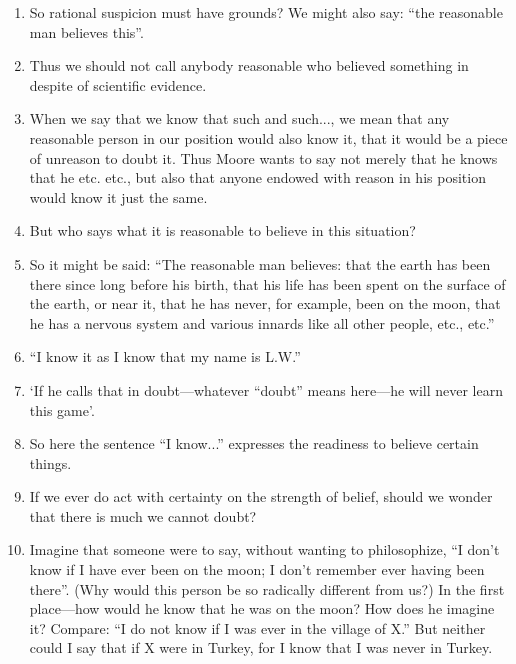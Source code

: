\documentclass{book}
\begin{document}
\begin{enumerate}
\item
So rational suspicion must have grounds?  We might also say: ``the reasonable
man believes this''.

\item
Thus we should not call anybody reasonable who believed something in despite of
scientific evidence.

\item
When we say that we know that such and such..., we mean that any reasonable
person in our position would also know it, that it would be a piece of unreason
to doubt it. Thus Moore wants to say not merely that he knows that he etc.
etc., but also that anyone endowed with reason in his position would know it
just the same.

\item
But who says what it is reasonable to believe in this situation?

\item
So it might be said: ``The reasonable man believes: that the earth has been
there since long before his birth, that his life has been spent on the surface
of the earth, or near it, that he has never, for example, been on the moon,
that he has a nervous system and various innards like all other people, etc.,
etc.''

\item
``I know it as I know that my name is L.W.''

\item
`If he calls that in doubt---whatever ``doubt'' means here---he will never
learn this game'.

\item
So here the sentence ``I know...'' expresses the readiness to believe certain
things.

\item
If we ever do act with certainty on the strength of belief, should we wonder
that there is much we cannot doubt?

\item
Imagine that someone were to say, without wanting to philosophize, ``I don't
know if I have ever been on the moon; I don't remember ever having been
there''. (Why would this person be so radically different from us?) In the
first place---how would he know that he was on the moon? How does he imagine
it? Compare: ``I do not know if I was ever in the village of X.'' But neither
could I say that if X were in Turkey, for I know that I was never in Turkey.


\end{enumerate}
\end{document}
